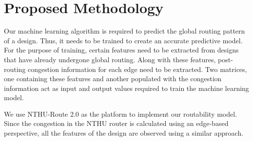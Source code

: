 \section{Proposed Methodology}
\label{sec:methodology}
Our machine learning algorithm is required to predict the global routing pattern of a design. Thus, it needs to be trained to create an accurate predictive model. For the purpose of training, certain features need to be extracted from designs that have already undergone global routing. Along with these features, post-routing congestion information for each edge need to be extracted. Two matrices, one containing these features and another populated with the congestion information act as input and output values required to train the machine learning model. 

We use NTHU-Route 2.0 \cite{NTHU} as the platform to implement our routability model. Since the congestion in the NTHU router is calculated using an edge-based perspective, all the features of the design are observed using a similar approach. 

